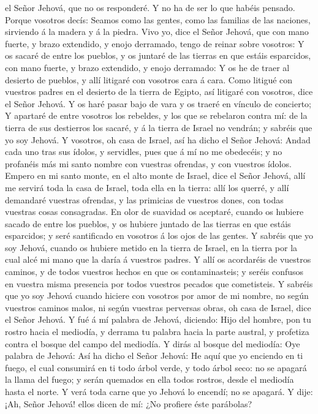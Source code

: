 el Señor Jehová, que no os responderé.  Y no ha de ser lo
que habéis pensado. Porque vosotros decís: Seamos como las gentes, como
las familias de las naciones, sirviendo á la madera y á la piedra.
 Vivo yo, dice el Señor Jehová, que con mano fuerte, y
brazo extendido, y enojo derramado, tengo de reinar sobre vosotros:
 Y os sacaré de entre los pueblos, y os juntaré de las
tierras en que estáis esparcidos, con mano fuerte, y brazo extendido, y
enojo derramado:  Y os he de traer al desierto de
pueblos, y allí litigaré con vosotros cara á cara.  Como
litigué con vuestros padres en el desierto de la tierra de Egipto, así
litigaré con vosotros, dice el Señor Jehová.  Y os haré
pasar bajo de vara y os traeré en vínculo de concierto; 
Y apartaré de entre vosotros los rebeldes, y los que se rebelaron contra
mí: de la tierra de sus destierros los sacaré, y á la tierra de Israel
no vendrán; y sabréis que yo soy Jehová.  Y vosotros, oh
casa de Israel, así ha dicho el Señor Jehová: Andad cada uno tras sus
ídolos, y servidles, pues que á mí no me obedecéis; y no profanéis más
mi santo nombre con vuestras ofrendas, y con vuestros ídolos.
 Empero en mi santo monte, en el alto monte de Israel,
dice el Señor Jehová, allí me servirá toda la casa de Israel, toda ella
en la tierra: allí los querré, y allí demandaré vuestras ofrendas, y las
primicias de vuestros dones, con todas vuestras cosas consagradas.
 En olor de suavidad os aceptaré, cuando os hubiere
sacado de entre los pueblos, y os hubiere juntado de las tierras en que
estáis esparcidos; y seré santificado en vosotros á los ojos de las
gentes.  Y sabréis que yo soy Jehová, cuando os hubiere
metido en la tierra de Israel, en la tierra por la cual alcé mi mano que
la daría á vuestros padres.  Y allí os acordaréis de
vuestros caminos, y de todos vuestros hechos en que os contaminasteis; y
seréis confusos en vuestra misma presencia por todos vuestros pecados
que cometisteis.  Y sabréis que yo soy Jehová cuando
hiciere con vosotros por amor de mi nombre, no según vuestros caminos
malos, ni según vuestras perversas obras, oh casa de Israel, dice el
Señor Jehová.  Y fué á mí palabra de Jehová, diciendo:
 Hijo del hombre, pon tu rostro hacia el mediodía, y
derrama tu palabra hacia la parte austral, y profetiza contra el bosque
del campo del mediodía.  Y dirás al bosque del mediodía:
Oye palabra de Jehová: Así ha dicho el Señor Jehová: He aquí que yo
enciendo en ti fuego, el cual consumirá en ti todo árbol verde, y todo
árbol seco: no se apagará la llama del fuego; y serán quemados en ella
todos rostros, desde el mediodía hasta el norte.  Y verá
toda carne que yo Jehová lo encendí; no se apagará.  Y
dije: ¡Ah, Señor Jehová! ellos dicen de mí: ¿No profiere éste parábolas?

